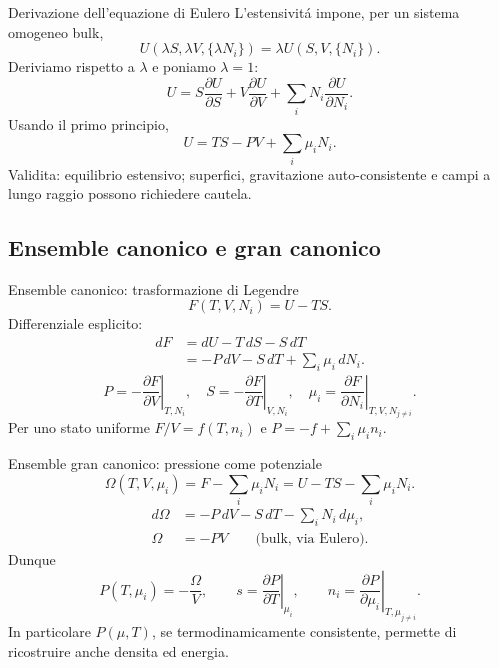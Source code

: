\begin{frame}[t]{Derivazione dell'equazione di Eulero}
\vspace*{3mm}
\small
L'estensivit\'a impone, per un sistema omogeneo bulk,
\[
U(\lambda S,\lambda V,\{\lambda N_i\})=\lambda U(S,V,\{N_i\}).
\]
Deriviamo rispetto a $\lambda$ e poniamo $\lambda=1$:
\[
U=S\frac{\partial U}{\partial S}+V\frac{\partial U}{\partial V}
 +\sum_iN_i\frac{\partial U}{\partial N_i}.
\]
Usando il primo principio,
\[
\boxed{U=TS-PV+\sum_i\mu_iN_i.}
\]
Validita: equilibrio estensivo; superfici, gravitazione auto-consistente e campi a lungo raggio possono richiedere cautela.
\end{frame}

\subsection{Ensemble canonico e gran canonico}

\begin{frame}[t]{Ensemble canonico: trasformazione di Legendre}
\vspace*{3mm}
\small
\[
F(T,V,N_i)=U-TS.
\]
Differenziale esplicito:
\[
\begin{aligned}
dF&=dU-T\,dS-S\,dT\\
&=-P\,dV-S\,dT+\sum_i\mu_i\,dN_i.
\end{aligned}
\]
\[
P=-\left.\frac{\partial F}{\partial V}\right|_{T,N_i},\quad
S=-\left.\frac{\partial F}{\partial T}\right|_{V,N_i},\quad
\mu_i=\left.\frac{\partial F}{\partial N_i}\right|_{T,V,N_{j\ne i}}.
\]
Per uno stato uniforme $F/V=f(T,n_i)$ e $P=-f+\sum_i\mu_i n_i$.
\end{frame}

\begin{frame}[t]{Ensemble gran canonico: pressione come potenziale}
\vspace*{3mm}
\small
\[
\Omega(T,V,\mu_i)=F-\sum_i\mu_iN_i=U-TS-\sum_i\mu_iN_i.
\]
\[
\begin{aligned}
d\Omega&=-P\,dV-S\,dT-\sum_iN_i\,d\mu_i,\\
\Omega&=-PV\qquad\text{(bulk, via Eulero).}
\end{aligned}
\]
Dunque
\[
P(T,\mu_i)=-\frac{\Omega}{V},\qquad
s=\left.\frac{\partial P}{\partial T}\right|_{\mu_i},\qquad
n_i=\left.\frac{\partial P}{\partial\mu_i}\right|_{T,\mu_{j\ne i}}.
\]
In particolare $P(\mu,T)$, se termodinamicamente consistente, permette di ricostruire anche densita ed energia.
\end{frame}

